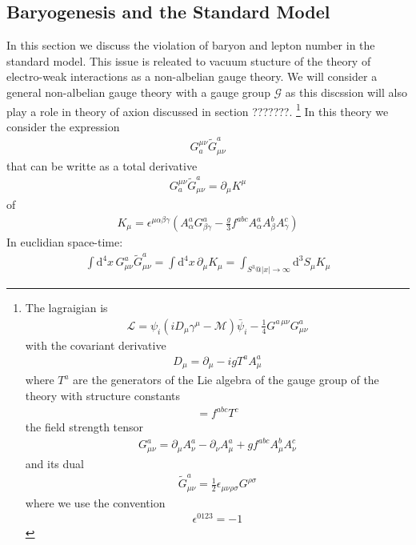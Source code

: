 \documentclass[13pt,a4paper,twoside,titlepage]{article}
\begin{document}
\subsection{Baryogenesis and the Standard Model}
In this section we discuss the violation of baryon and lepton number in the standard model. This issue is releated to vacuum stucture of the theory of electro-weak interactions as a
non-albelian gauge theory.
We will consider a general non-albelian gauge theory with a gauge group $\mathcal{G}$ as this discssion will also play a role in theory of axion discussed in section ???????.  \footnote{
The lagraigian is
\begin{align}
    \mathcal{L} = \psi_i \left( i D_\mu \gamma^\mu - \mathcal{M} \right) \bar{\psi}_i - \frac{1}{4} G^{a \, \mu \nu} G^a_{\mu \nu}
\end{align}
with the covariant derivative
\begin{align}
    D_\mu = \partial_\mu - i g T^a A^a_\mu
\end{align}
where $T^a$ are the generators of the Lie algebra of the gauge group of the theory with structure constants
\begin{align}
    [T^a, T^b] = f^{abc} T^c
\end{align}
the field strength tensor
\begin{align}
    G^a_{\mu \nu} = \partial_\mu A^a_\nu - \partial_\nu A^a_\mu + g f^{abc} A^b_\mu A^c_\nu
\end{align}
and its dual
\begin{align}
    \tilde{G}_{\mu \nu}^a = \frac{1}{2} \epsilon_{\mu \nu \rho \sigma} G^{\rho \sigma}
\end{align}
where we use the convention
\begin{align}
    \epsilon^{0123} = -1
\end{align}
}
In this theory we consider the expression
\begin{align}
    G^{\mu \nu}_a \tilde{G}^a_{\mu \nu}
\end{align}
that can be writte as a total derivative
\begin{align}
    G^{\mu \nu}_a \tilde{G}^a_{\mu \nu} = \partial_\mu K^\mu
\end{align}
of
\begin{align}
    K_\mu = \epsilon^{\mu \alpha \beta \gamma} \left( A^a_\alpha G^a_{\beta \gamma} - \frac{g}{3} f^{abc} A^a_\alpha A^b_\beta A^c_\gamma \right)
\end{align}
In euclidian space-time:
\begin{align}
    \label{eq:eucleadian_integral}
    \int \mathrm{d}^4 x \, G^a_{\mu \nu} \tilde{G}^a_{\mu \nu} = \int \mathrm{d}^4 x \, \partial_\mu K_\mu = \int_{S^3 @ |x| \to \infty} \mathrm{d}^3 S_\mu K_\mu
\end{align}
\end{document}
